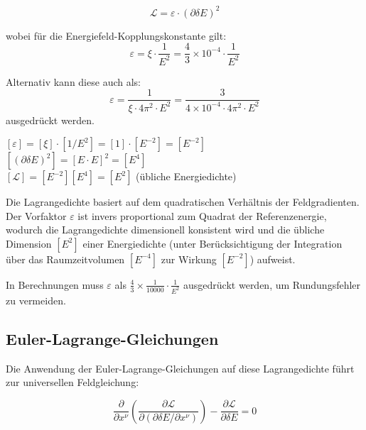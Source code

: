 \documentclass[12pt,a4paper]{article}
\newcommand{\dfield}{\delta E}
\theoremstyle{definition}
\begin{document}
	\begin{equation}
		\boxed{\mathcal{L} = \varepsilon \cdot (\partial\dfield)^2}
	\end{equation}
	
	wobei für die Energiefeld-Kopplungskonstante gilt:
	\begin{equation}
		\varepsilon = \xi \cdot \frac{1}{E^2} = \frac{4}{3} \times 10^{-4} \cdot \frac{1}{E^2}
	\end{equation}
	
	Alternativ kann diese auch als:
	\begin{equation}
		\varepsilon = \frac{1}{\xi \cdot 4\pi^2 \cdot E^2} = \frac{3}{4 \times 10^{-4} \cdot 4\pi^2 \cdot E^2}
	\end{equation}
	ausgedrückt werden.
	
	\begin{einheitencheck}
		$[\varepsilon] = [\xi] \cdot [1/E^2] = [1] \cdot [E^{-2}] = [E^{-2}]$\\
		$[(\partial\dfield)^2] = [E \cdot E]^2 = [E^4]$\\
		$[\mathcal{L}] = [E^{-2}][E^4] = [E^2]$ (übliche Energiedichte) \checkmark
	\end{einheitencheck}
	
	\begin{verhaltnis}
		Die Lagrangedichte basiert auf dem quadratischen Verhältnis der Feldgradienten. Der Vorfaktor $\varepsilon$ ist invers proportional zum Quadrat der Referenzenergie, wodurch die Lagrangedichte dimensionell konsistent wird und die übliche Dimension $[E^2]$ einer Energiedichte (unter Berücksichtigung der Integration über das Raumzeitvolumen $[E^{-4}]$ zur Wirkung $[E^{-2}]$) aufweist.
		
		In Berechnungen muss $\varepsilon$ als $\frac{4}{3} \times \frac{1}{10000} \cdot \frac{1}{E^2}$ ausgedrückt werden, um Rundungsfehler zu vermeiden.
	\end{verhaltnis}
	
	\subsection{Euler-Lagrange-Gleichungen}
	
	Die Anwendung der Euler-Lagrange-Gleichungen auf diese Lagrangedichte führt zur universellen Feldgleichung:
	
	\begin{equation}
		\frac{\partial}{\partial x^\nu}\left(\frac{\partial \mathcal{L}}{\partial(\partial \dfield/\partial x^\nu)}\right) - \frac{\partial \mathcal{L}}{\partial \dfield} = 0
	\end{equation}
	
\end{document}
